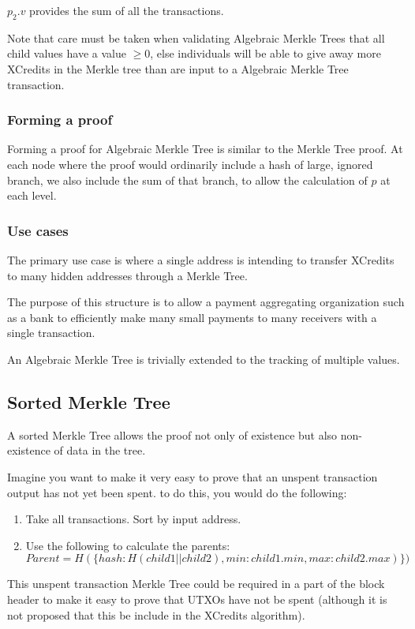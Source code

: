 \documentclass[a4paper,12pt]{article}
\begin{document}
$p_2.v$ provides the sum of all the transactions. 

Note that care must be taken when validating Algebraic Merkle Trees that all child values have a value $\geq 0$, else individuals will be able to give away more XCredits in the Merkle tree than are input to a Algebraic Merkle Tree transaction.

\subsubsection{Forming a proof}
Forming a proof for Algebraic Merkle Tree is similar to the Merkle Tree proof. At each node where the proof would ordinarily include a hash of large, ignored branch, we also include the sum of that branch, to allow the calculation of $p$ at each level. 

\subsubsection{Use cases}
The primary use case is where a single address is intending to transfer XCredits to many hidden addresses through a Merkle Tree. 

The purpose of this structure is to allow a payment aggregating organization such as a bank to efficiently make many small payments to many receivers with a single transaction.

An Algebraic Merkle Tree is trivially extended to the tracking of multiple values. 


\subsection{Sorted Merkle Tree}
A sorted Merkle Tree allows the proof not only of existence but also non-existence of data in the tree. 

Imagine you want to make it very easy to prove that an unspent transaction output has not yet been spent. to do this, you would do the following:
\begin{enumerate}
  \item Take all transactions. Sort by input address.
  \item  Use the following to calculate the parents:
\[Parent = H(\{hash: H(child1 || child2), min: child1.min, max: child2.max)\})\]
\end{enumerate}


This unspent transaction Merkle Tree could be required in a part of the block header to make it easy to prove that UTXOs have not be spent (although it is not proposed that this be include in the XCredits algorithm).
\end{document}
